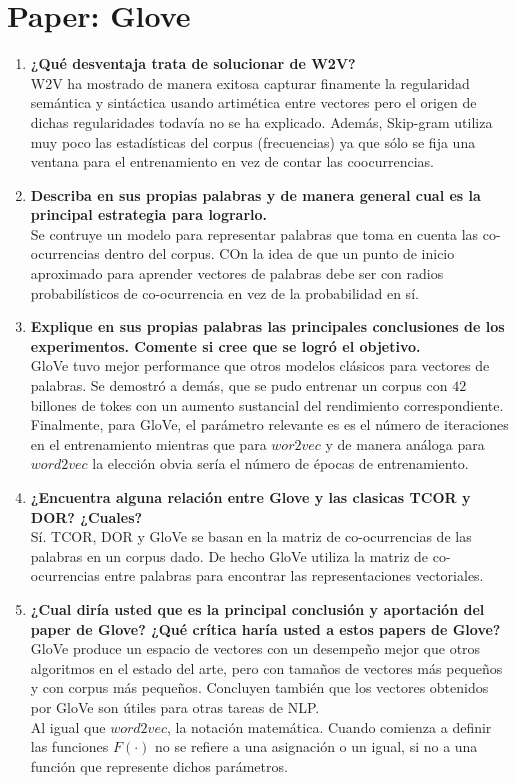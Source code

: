\documentclass[11pt,letterpaper]{article}
\theoremstyle{definition}
\theoremstyle{definition}
\theoremstyle{definition}
\begin{document}
\section{Paper: Glove}
\begin{enumerate}
	\item \textbf{¿Qué desventaja trata de solucionar de W2V?}
	\\
	W2V ha mostrado de manera exitosa capturar finamente la regularidad semántica y sintáctica usando artimética entre vectores pero el origen de dichas regularidades todavía no se ha explicado. Además, Skip-gram utiliza muy poco las estadísticas del corpus (frecuencias) ya que sólo se fija una ventana para el entrenamiento en vez de contar las coocurrencias. 
	\item \textbf{Describa en sus propias palabras y de manera general cual es la principal estrategia para lograrlo.}	
	\\
	Se contruye un modelo para representar palabras que toma en cuenta las co-ocurrencias dentro del corpus. COn la idea de que un punto de inicio aproximado para aprender vectores de palabras debe ser con radios probabilísticos de co-ocurrencia  en vez de la probabilidad en sí.
	\item \textbf{Explique en sus propias palabras las principales conclusiones de los experimentos. Comente si cree que se logró el objetivo.}	
	\\
	GloVe tuvo mejor performance que otros modelos clásicos para vectores de palabras. Se demostró a demás, que se pudo entrenar un corpus con $ 42 $ billones de tokes con un aumento sustancial del rendimiento correspondiente. Finalmente, para GloVe, el parámetro relevante es es el número de iteraciones en el entrenamiento mientras que para $ wor2vec $ y de manera análoga para $ word2vec $ la elección obvia sería el número de épocas de entrenamiento.
	\item \textbf{¿Encuentra alguna relación entre Glove y las clasicas TCOR y DOR? ¿Cuales?}
	\\
	Sí. TCOR, DOR y GloVe se basan en la matriz de co-ocurrencias de las palabras en un corpus dado. De hecho GloVe utiliza la matriz de co-ocurrencias entre palabras para encontrar las representaciones vectoriales.
	\item \textbf{¿Cual diría usted que es la principal conclusión y aportación del paper de Glove? ¿Qué crítica haría usted a estos papers de Glove?}	
	\\
	GloVe produce un espacio de vectores con un desempeño mejor que otros algoritmos en el estado del arte, pero con tamaños de vectores más pequeños y con corpus más pequeños. Concluyen también que los vectores obtenidos por GloVe son útiles para otras tareas de NLP. 
	\\
	Al igual que $ word2vec $, la notación matemática. Cuando comienza a definir las funciones $ F(\cdot) $ no se refiere a una asignación o un igual, si no a una función que represente dichos parámetros.
\end{enumerate}
\end{document}

